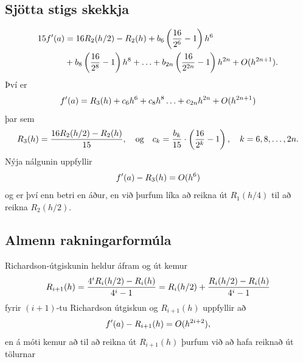 \documentclass[letterpaper,10pt,icelandic]{sphinxmanual}
\begin{document}
\subsection{Sjötta stigs skekkja}
\label{kafli04:sjotta-stigs-skekkja}\begin{gather}
\begin{split}\begin{aligned}
  15f'(a) &= 16 R_2(h/2) - R_2(h)
  + b_6 \left( \frac{16}{2^6} - 1 \right) h^6 \\
  &+ b_8 \left( \frac{16}{2^8} - 1 \right) h^8
  + \ldots
  + b_{2n} \left( \frac{16}{2^{2n}} - 1 \right) h^{2n}
  + O(h^{2n+1}).\end{aligned}\end{split}\notag
\end{gather}
Því er
\begin{gather}
\begin{split}f'(a) = R_3(h) + c_6 h^6 + c_8 h^8 \ldots + c_{2n} h^{2n}
  + O(h^{2n+1})\end{split}\notag
\end{gather}
þar sem
\begin{gather}
\begin{split}R_3(h) = \frac{16 R_2(h/2) - R_2(h)}{15},
  \quad \text{og} \quad
  c_k = \frac{b_k}{15} \cdot \left( \frac{16}{2^k} - 1 \right),
  \quad k = 6,8,\ldots,2n.\end{split}\notag
\end{gather}
Nýja nálgunin uppfyllir
\begin{gather}
\begin{split}f'(a) - R_3(h) = O(h^6)\end{split}\notag
\end{gather}
og er því enn betri en áður, en við þurfum líka að reikna út
\(R_1(h/4)\) til að reikna \(R_2(h/2)\).


\subsection{Almenn rakningarformúla}
\label{kafli04:almenn-rakningarformula}
Richardson-útgiskunin heldur áfram og út kemur
\begin{gather}
\begin{split}R_{i+1}(h) = \frac{4^i R_i(h/2) - R_i(h)}{4^i-1}
  = R_i(h/2) + \frac{R_i(h/2)-R_i(h)}{4^i-1}\end{split}\notag
\end{gather}
fyrir \((i+1)\)-tu Richardson útgiskun og \(R_{i+1}(h)\)
uppfyllir að
\begin{gather}
\begin{split}f'(a) - R_{i+1}(h) = O(h^{2i+2}),\end{split}\notag
\end{gather}
en á móti kemur að til að reikna út \(R_{i+1}(h)\) þurfum við að
hafa reiknað út tölurnar
\end{document}
